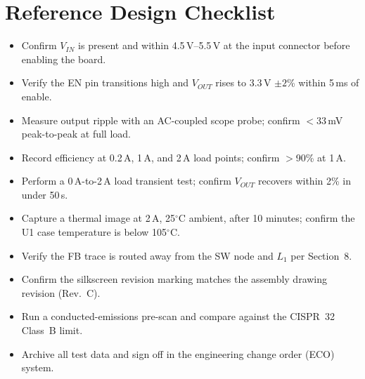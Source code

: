 \section{Reference Design Checklist}
\begin{itemize}[label=$\square$,leftmargin=1.3em,itemsep=5pt]
\item Confirm $V_{IN}$ is present and within 4.5\,V--5.5\,V at the input
      connector before enabling the board.
\item Verify the EN pin transitions high and $V_{OUT}$ rises to
      3.3\,V $\pm2$\% within 5\,ms of enable.
\item Measure output ripple with an AC-coupled scope probe; confirm
      $<$33\,mV peak-to-peak at full load.
\item Record efficiency at 0.2\,A, 1\,A, and 2\,A load points; confirm
      $>$90\% at 1\,A.
\item Perform a 0\,A-to-2\,A load transient test; confirm $V_{OUT}$
      recovers within 2\% in under 50\,\textmu s.
\item Capture a thermal image at 2\,A, 25$^\circ$C ambient, after 10 minutes;
      confirm the U1 case temperature is below 105$^\circ$C.
\item Verify the FB trace is routed away from the SW node and $L_1$ per
      Section~8.
\item Confirm the silkscreen revision marking matches the assembly drawing
      revision (Rev.~C).
\item Run a conducted-emissions pre-scan and compare against the
      CISPR~32 Class~B limit.
\item Archive all test data and sign off in the engineering change order
      (ECO) system.
\end{itemize}

